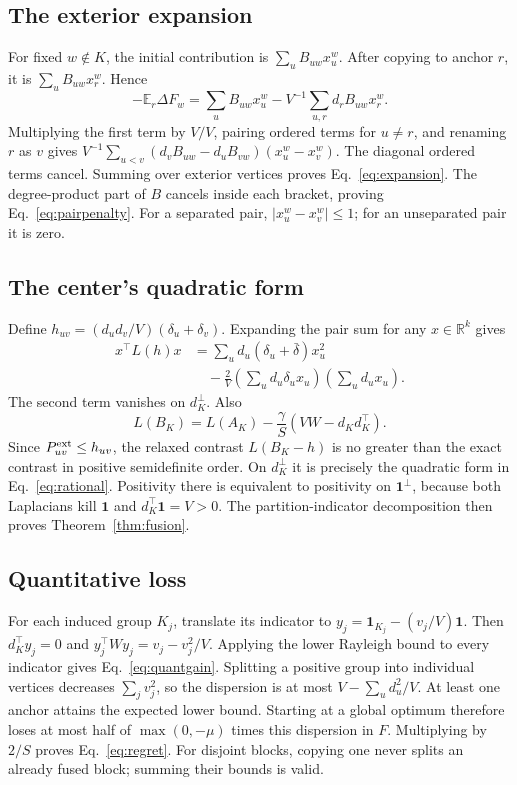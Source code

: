\documentclass[sigconf,anonymous,review]{acmart}
\newcommand{\1}{\mathbf{1}}
\newcommand{\R}{\mathbb{R}}
\newcommand{\E}{\mathbb{E}}
\begin{document}
\subsection{The exterior expansion}
For fixed $w\notin K$, the initial contribution is
$\sum_u B_{uw}x_u^w$. After copying to anchor $r$, it is
$\sum_u B_{uw}x_r^w$. Hence
\[
 -\E_r\Delta F_w=\sum_u B_{uw}x_u^w-
 V^{-1}\sum_{u,r}d_r B_{uw}x_r^w.
\]
Multiplying the first term by $V/V$, pairing ordered terms for $u\ne r$, and
renaming $r$ as $v$ gives
$V^{-1}\sum_{u<v}(d_vB_{uw}-d_uB_{vw})(x_u^w-x_v^w)$.
The diagonal ordered terms cancel. Summing over exterior vertices proves
Eq.~\eqref{eq:expansion}. The degree-product part of $B$ cancels inside each
bracket, proving Eq.~\eqref{eq:pairpenalty}. For a separated pair,
$|x_u^w-x_v^w|\leq 1$; for an unseparated pair it is zero.

\subsection{The center's quadratic form}\label{app:center-quadratic}
Define $h_{uv}=(d_ud_v/V)(\delta_u+\delta_v)$. Expanding the pair sum for any
$x\in\R^k$ gives
\begin{align*}
 x^\top L(h)x
 &=\sum_u d_u(\delta_u+\bar\delta)x_u^2\\
 &\quad-\frac 2V\left(\sum_ud_u\delta_u x_u\right)
                    \left(\sum_ud_u x_u\right).
\end{align*}
The second term vanishes on $d_K^\perp$. Also
\[
 L(B_K)=L(A_K)-\frac\gamma S(VW-d_Kd_K^\top).
\]
Since $P_{uv}^{\rm ext}\leq h_{uv}$, the relaxed contrast
$L(B_K-h)$ is no greater than the exact contrast in positive semidefinite
order. On $d_K^\perp$ it is precisely the quadratic form in
Eq.~\eqref{eq:rational}. Positivity there is equivalent to positivity on
$\1^\perp$, because both Laplacians kill $\1$ and $d_K^\top\1=V>0$.
The partition-indicator decomposition then proves Theorem~\ref{thm:fusion}.

\subsection{Quantitative loss}
For each induced group $K_j$, translate its indicator to
$y_j=\1_{K_j}-(v_j/V)\1$. Then $d_K^\top y_j=0$ and
$y_j^\top W y_j=v_j-v_j^2/V$. Applying the lower Rayleigh bound to every
indicator gives Eq.~\eqref{eq:quantgain}. Splitting a positive group into
individual vertices decreases $\sum_jv_j^2$, so the dispersion is at most
$V-\sum_ud_u^2/V$. At least one anchor attains the expected lower bound.
Starting at a global optimum therefore loses at most half of
$\max(0,-\mu)$ times this dispersion in $F$. Multiplying by $2/S$ proves
Eq.~\eqref{eq:regret}. For disjoint blocks, copying one never splits an
already fused block; summing their bounds is valid.
\end{document}

